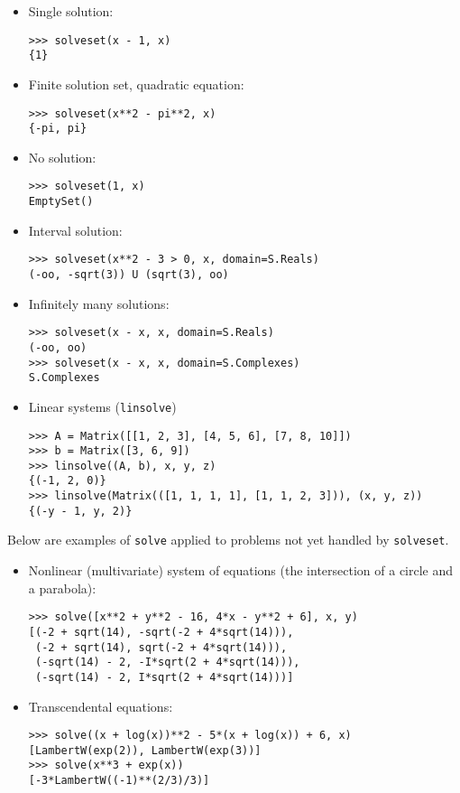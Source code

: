 \begin{itemize}
\item Single solution:
\begin{verbatim}
>>> solveset(x - 1, x)
{1}
\end{verbatim}

\item Finite solution set, quadratic equation:
\begin{verbatim}
>>> solveset(x**2 - pi**2, x)
{-pi, pi}
\end{verbatim}

\item No solution:
\begin{verbatim}
>>> solveset(1, x)
EmptySet()
\end{verbatim}

\item Interval solution:
\begin{verbatim}
>>> solveset(x**2 - 3 > 0, x, domain=S.Reals)
(-oo, -sqrt(3)) U (sqrt(3), oo)
\end{verbatim}

\item Infinitely many solutions:
\begin{verbatim}
>>> solveset(x - x, x, domain=S.Reals)
(-oo, oo)
>>> solveset(x - x, x, domain=S.Complexes)
S.Complexes
\end{verbatim}

\item Linear systems (\texttt{linsolve})
\begin{verbatim}
>>> A = Matrix([[1, 2, 3], [4, 5, 6], [7, 8, 10]])
>>> b = Matrix([3, 6, 9])
>>> linsolve((A, b), x, y, z)
{(-1, 2, 0)}
>>> linsolve(Matrix(([1, 1, 1, 1], [1, 1, 2, 3])), (x, y, z))
{(-y - 1, y, 2)}
\end{verbatim}
\end{itemize}

Below are examples of \texttt{solve} applied to problems not yet handled by \texttt{solveset}.

\begin{itemize}
\item Nonlinear (multivariate) system of equations (the intersection of a circle
and a parabola):
\begin{verbatim}
>>> solve([x**2 + y**2 - 16, 4*x - y**2 + 6], x, y)
[(-2 + sqrt(14), -sqrt(-2 + 4*sqrt(14))),
 (-2 + sqrt(14), sqrt(-2 + 4*sqrt(14))),
 (-sqrt(14) - 2, -I*sqrt(2 + 4*sqrt(14))),
 (-sqrt(14) - 2, I*sqrt(2 + 4*sqrt(14)))]
\end{verbatim}

\item Transcendental equations:
\begin{verbatim}
>>> solve((x + log(x))**2 - 5*(x + log(x)) + 6, x)
[LambertW(exp(2)), LambertW(exp(3))]
>>> solve(x**3 + exp(x))
[-3*LambertW((-1)**(2/3)/3)]
\end{verbatim}
\end{itemize}

